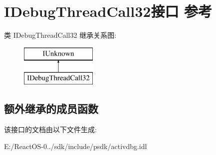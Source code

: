 \hypertarget{interface_i_debug_thread_call32}{}\section{I\+Debug\+Thread\+Call32接口 参考}
\label{interface_i_debug_thread_call32}
类 I\+Debug\+Thread\+Call32 继承关系图\+:\begin{figure}[H]
\begin{center}
\leavevmode
\includegraphics[height=2.000000cm]{interface_i_debug_thread_call32}
\end{center}
\end{figure}
\subsection*{额外继承的成员函数}


该接口的文档由以下文件生成\+:\begin{DoxyCompactItemize}
\item 
E\+:/\+React\+O\+S-\/0../sdk/include/psdk/activdbg.\+idl\end{DoxyCompactItemize}
